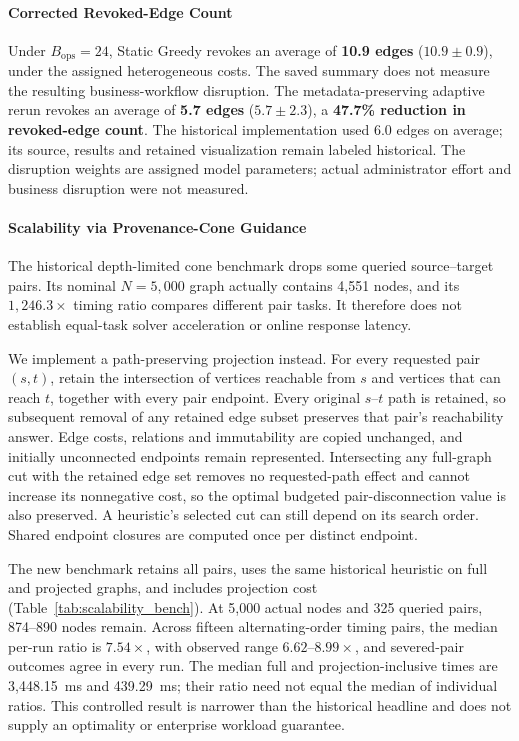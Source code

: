 \paragraph{Corrected Revoked-Edge Count}
Under $B_{\text{ops}} = 24$, Static Greedy revokes an average of \textbf{10.9 edges} ($10.9 \pm 0.9$), under the assigned heterogeneous costs. The saved summary does not measure the resulting business-workflow disruption. The metadata-preserving adaptive rerun revokes an average of \textbf{5.7 edges} ($5.7 \pm 2.3$), a \textbf{47.7\% reduction in revoked-edge count}. The historical implementation used 6.0 edges on average; its source, results and retained visualization remain labeled historical. The disruption weights are assigned model parameters; actual administrator effort and business disruption were not measured.



\paragraph{Scalability via Provenance-Cone Guidance}
The historical depth-limited cone benchmark drops some queried source--target pairs. Its nominal $N=5,000$ graph actually contains 4,551 nodes, and its $1,246.3\times$ timing ratio compares different pair tasks. It therefore does not establish equal-task solver acceleration or online response latency.

We implement a path-preserving projection instead. For every requested pair $(s,t)$, retain the intersection of vertices reachable from $s$ and vertices that can reach $t$, together with every pair endpoint. Every original $s$--$t$ path is retained, so subsequent removal of any retained edge subset preserves that pair's reachability answer. Edge costs, relations and immutability are copied unchanged, and initially unconnected endpoints remain represented. Intersecting any full-graph cut with the retained edge set removes no requested-path effect and cannot increase its nonnegative cost, so the optimal budgeted pair-disconnection value is also preserved. A heuristic's selected cut can still depend on its search order. Shared endpoint closures are computed once per distinct endpoint.

The new benchmark retains all pairs, uses the same historical heuristic on full and projected graphs, and includes projection cost (Table~\ref{tab:scalability_bench}). At 5,000 actual nodes and 325 queried pairs, 874--890 nodes remain. Across fifteen alternating-order timing pairs, the median per-run ratio is $7.54\times$, with observed range $6.62$--$8.99\times$, and severed-pair outcomes agree in every run. The median full and projection-inclusive times are 3,448.15~ms and 439.29~ms; their ratio need not equal the median of individual ratios. This controlled result is narrower than the historical headline and does not supply an optimality or enterprise workload guarantee.
